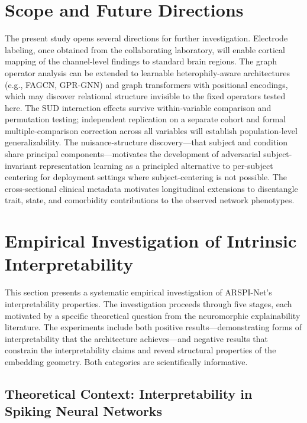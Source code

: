 \section{Scope and Future Directions}
\label{sec:ch5_scope}

The present study opens several directions for further investigation. Electrode labeling, once obtained from the collaborating laboratory, will enable cortical mapping of the channel-level findings to standard brain regions. The graph operator analysis can be extended to learnable heterophily-aware architectures (e.g., FAGCN, GPR-GNN) and graph transformers with positional encodings, which may discover relational structure invisible to the fixed operators tested here. The SUD interaction effects survive within-variable comparison and permutation testing; independent replication on a separate cohort and formal multiple-comparison correction across all variables will establish population-level generalizability. The nuisance-structure discovery---that subject and condition share principal components---motivates the development of adversarial subject-invariant representation learning as a principled alternative to per-subject centering for deployment settings where subject-centering is not possible. The cross-sectional clinical metadata motivates longitudinal extensions to disentangle trait, state, and comorbidity contributions to the observed network phenotypes.


\section{Empirical Investigation of Intrinsic Interpretability}
\label{sec:ch5_interpretability_investigation}

This section presents a systematic empirical investigation of ARSPI-Net's interpretability properties. The investigation proceeds through five stages, each motivated by a specific theoretical question from the neuromorphic explainability literature. The experiments include both positive results---demonstrating forms of interpretability that the architecture achieves---and negative results that constrain the interpretability claims and reveal structural properties of the embedding geometry. Both categories are scientifically informative.

\subsection{Theoretical Context: Interpretability in Spiking Neural Networks}
\label{sec:interp_theory}


